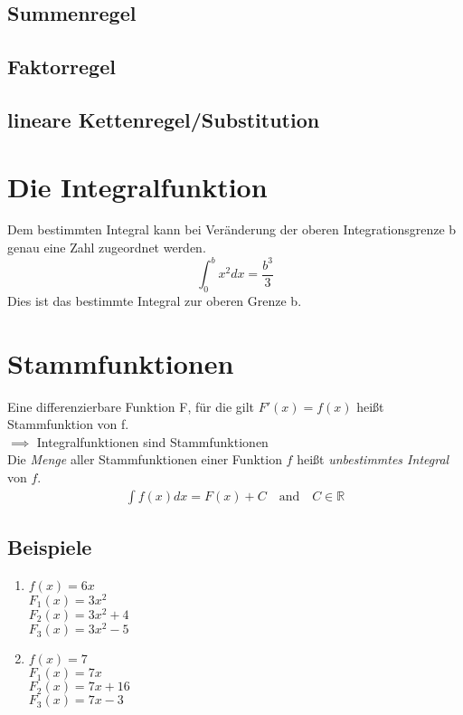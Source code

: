 \documentclass[12pt, a4paper]{report}
\begin{document}
\subsection{Summenregel}
\subsection{Faktorregel}
\subsection{lineare Kettenregel/Substitution}

\section{Die Integralfunktion}
Dem bestimmten Integral kann bei Veränderung der oberen Integrationsgrenze b genau eine Zahl zugeordnet werden.
\begin{equation}
\int_0^b x^2 dx=\frac{b^3}{3}
\end{equation}
Dies ist das bestimmte Integral zur oberen Grenze b.


\section{Stammfunktionen}
Eine differenzierbare Funktion F, für die gilt $F'(x)=f(x)$ heißt Stammfunktion von f. \\
$\implies$ Integralfunktionen sind Stammfunktionen\\
Die \emph{Menge} aller Stammfunktionen einer Funktion $f$ heißt \emph{unbestimmtes Integral} von $f$.\\

\begin{equation}
\begin{aligned}
\int f(x) dx=F(x)+C \quad \textrm{and} \quad C\in \mathbb{R}
\end{aligned}
\end{equation}

\subsection{Beispiele}
\begin{enumerate}
\item $f(x)=6x$\\
$F_1(x)=3x^2$\\
$F_2(x)=3x^2+4$\\
$F_3(x)=3x^2-5$
\item $f(x)=7$\\
$F_1(x)=7x$\\
$F_2(x)=7x+16$\\
$F_3(x)=7x-3$
\end{enumerate}
\end{document}
